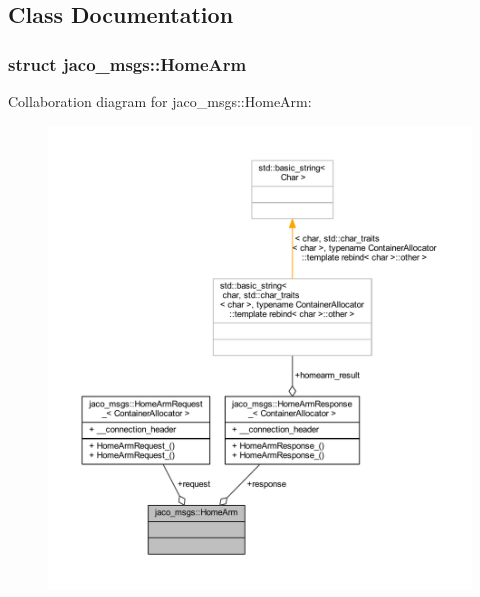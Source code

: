 \subsection{Class Documentation}
\label{structjaco__msgs_1_1HomeArm}
\hypertarget{namespacejaco__msgs_structjaco__msgs_1_1HomeArm}{}
\subsubsection{struct jaco\+\_\+msgs\+:\+:Home\+Arm}


Collaboration diagram for jaco\+\_\+msgs\+:\+:Home\+Arm\+:
\nopagebreak
\begin{figure}[H]
\begin{center}
\leavevmode
\includegraphics[width=350pt]{dd/df4/structjaco__msgs_1_1HomeArm__coll__graph}
\end{center}
\end{figure}
